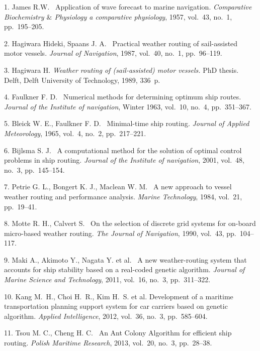 

{\footnotesize

\vskip 4mm


\vskip 4mm

{1}. James R.W. ~Application of wave forecast to marine
navigation.     \textit{ Comparative Biochemistry $\&$  Physiology
a comparative physiology}, 1957, vol.~43, no.~1, pp.~195--205.

{2}. Hagiwara Hideki, Spaans J. A. ~Practical weather routing of
sail-assisted motor vessels. \textit{Journal of Navigation}, 1987,
vol.~40, no.~1, pp.~96--119.

{3}. Hagiwara H. \textit{Weather routing of (sail-assisted) motor
vessels.} PhD thesis. Delft, Delft University of Technology, 1989,
336~p.

{4}. Faulkner F. D. ~Numerical methods for determining optimum
ship routes. \textit{ Journal of the Institute of navigation},
Winter 1963, vol.~10, no.~4, pp.~351--367.

{5}. Bleick W. E., Faulkner F. D. ~Minimal-time ship routing.
\textit{Journal of Applied Meteorology}, 1965, vol.~4, no.~2,
pp.~217--221.

{6}. Bijlsma S. J. ~A computational method for the solution of
optimal control problems in ship routing. \textit{Journal of the
Institute of navigation}, 2001, vol.~48, no.~3, pp.~145--154.

{7}. Petrie G. L., Bongert K. J., Maclean W. M. ~A new approach to
vessel weather routing and performance analysis. \textit{Marine
Technology}, 1984, vol.~21, pp.~19--41.

{8}. Motte R. H.,  Calvert S. ~On the selection of discrete grid
systems for on-board micro-based weather routing. \textit{The
Journal of Navigation}, 1990, vol.~43, pp.~104--117.

{9}. Maki A., Akimoto Y., Nagata Y. et al. ~A new weather-routing
system that accounts for ship stability based on a real-coded
genetic algorithm. \textit{Journal of Marine Science and
Technology}, 2011, vol.~16, no.~3, pp.~311--322.

{10}. Kang M.~H., Choi H.~R., Kim H.~S. et al. Development of a
maritime transportation planning support system for car carriers
based on genetic algorithm. \textit{ Applied Intelligence}, 2012,
vol.~36, no.~3, pp.~585--604.

{11}. Tsou M. C., Cheng H. C. ~An Ant Colony Algorithm for
efficient ship routing. \textit{ Polish Maritime Research}, 2013,
vol.~20, no.~3, pp.~28--38.

}
